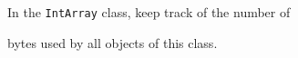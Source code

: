 In the \texttt{IntArray} class, keep track of the number of

bytes used by all objects of this class.

